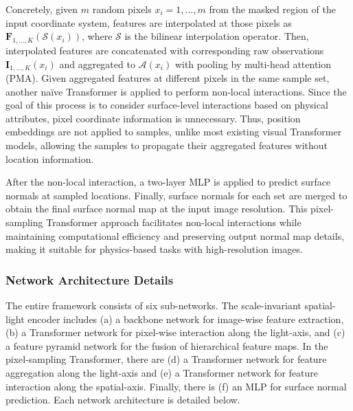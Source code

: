 Concretely, given $m$ random pixels $x_i=1, \ldots, m$ from the masked region of the input coordinate system, features are interpolated at those pixels as $\mathbf{F}_{1,\ldots,K}(\mathcal{S}(x_i))$, where $\mathcal{S}$ is the bilinear interpolation operator. Then, interpolated features are concatenated with corresponding raw observations $\mathbf{I}_{1,\ldots,K}(x_i)$ and aggregated to $\mathcal{A}(x_i)$ with pooling by multi-head attention (PMA). Given aggregated features at different pixels in the same sample set, another naïve Transformer is applied to perform non-local interactions. Since the goal of this process is to consider surface-level interactions based on physical attributes, pixel coordinate information is unnecessary. Thus, position embeddings are not applied to samples, unlike most existing visual Transformer models, allowing the samples to propagate their aggregated features without location information.

After the non-local interaction, a two-layer MLP is applied to predict surface normals at sampled locations. Finally, surface normals for each set are merged to obtain the final surface normal map at the input image resolution. This pixel-sampling Transformer approach facilitates non-local interactions while maintaining computational efficiency and preserving output normal map details, making it suitable for physics-based tasks with high-resolution images.

\subsubsection{Network Architecture Details}

The entire framework consists of six sub-networks. The scale-invariant spatial-light encoder includes (a) a backbone network for image-wise feature extraction, (b) a Transformer network for pixel-wise interaction along the light-axis, and (c) a feature pyramid network for the fusion of hierarchical feature maps. In the pixel-sampling Transformer, there are (d) a Transformer network for feature aggregation along the light-axis and (e) a Transformer network for feature interaction along the spatial-axis. Finally, there is (f) an MLP for surface normal prediction. Each network architecture is detailed below.

